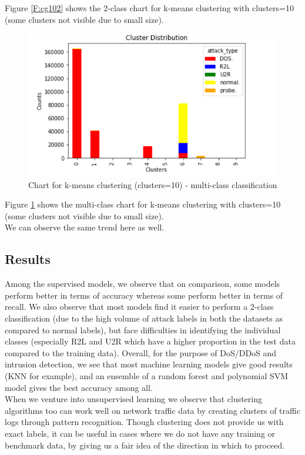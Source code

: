 Figure \ref{F:cg102} shows the 2-class chart for k-means clustering with clusters=10 (some clusters not visible due to small size).\\
\begin{figure}
	\includegraphics[width=1.0\columnwidth]{images/cluster10allgraph.PNG}
	\caption{Chart for k-means clustering (clusters=10) - multi-class classification}
	\label{F:cg10all}
\end{figure}
Figure \ref{F:cg10all} shows the multi-class chart for k-means clustering with clusters=10 (some clusters not visible due to small size).\\
We can observe the same trend here as well.

\subsection{Results}
Among the supervised models, we observe that on comparison, some models perform better in terms of accuracy whereas some perform better in terms of recall. We also observe that most models find it easier to perform a 2-class classification (due to the high volume of attack labels in both the datasets as compared to normal labels), but face difficulties in identifying the individual classes (especially R2L and U2R which have a higher proportion in the test data compared to the training data). Overall, for the purpose of DoS/DDoS and intrusion detection, we see that most machine learning models give good results (KNN for example), and an ensemble of a random forest and polynomial SVM model gives the best accuracy among all.\\
When we venture into unsupervised learning we observe that clustering algorithms too can work well on network traffic data by creating clusters of traffic logs through pattern recognition. Though clustering does not provide us with exact labels, it can be useful in cases where we do not have any training or benchmark data, by giving us a fair idea of the direction in which to proceed.

